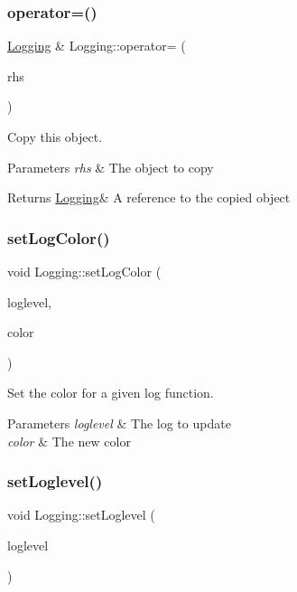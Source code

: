 \subsubsection{\texorpdfstring{operator=()}{operator=()}}
{\footnotesize\ttfamily \hyperlink{class_logging}{Logging} \& Logging\+::operator= (\begin{DoxyParamCaption}\item[{\hyperlink{class_logging}{Logging} const \&}]{rhs }\end{DoxyParamCaption})}



Copy this object. 


\begin{DoxyParams}{Parameters}
{\em rhs} & The object to copy \\
\hline
\end{DoxyParams}
\begin{DoxyReturn}{Returns}
\hyperlink{class_logging}{Logging}\& A reference to the copied object 
\end{DoxyReturn}
\mbox{\label{class_logging_a8f4283898adff3dd6cf1653b2f9dd9cb}} 
\subsubsection{\texorpdfstring{set\+Log\+Color()}{setLogColor()}}
{\footnotesize\ttfamily void Logging\+::set\+Log\+Color (\begin{DoxyParamCaption}\item[{e\+Loglevel}]{loglevel,  }\item[{std\+::string const \&}]{color }\end{DoxyParamCaption})}



Set the color for a given log function. 


\begin{DoxyParams}{Parameters}
{\em loglevel} & The log to update \\
\hline
{\em color} & The new color \\
\hline
\end{DoxyParams}
\mbox{\label{class_logging_a5165a7c0ff67c0cd90e651af28e6a65f}} 
\subsubsection{\texorpdfstring{set\+Loglevel()}{setLoglevel()}}
{\footnotesize\ttfamily void Logging\+::set\+Loglevel (\begin{DoxyParamCaption}\item[{e\+Loglevel}]{loglevel }\end{DoxyParamCaption})}



